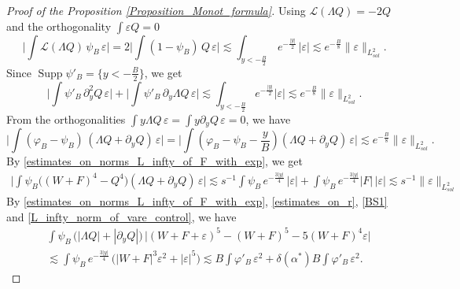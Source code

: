 \documentclass[16pt,english, oneside,reqno]{smfart}
\newcommand{\vare}{{\varepsilon}}
\newcommand{\vphi}{{\varphi}}
\DeclareMathOperator{\supp}{Supp}
\begin{document}
\begin{proof}[Proof of the Proposition \ref{Proposition_Monot_formula}]
Using $\mathcal{L}(\Lambda Q)  = -2 Q$ and the orthogonality $\int \vare Q = 0$
\begin{equation}
    \Big\lvert \int \mathcal{L}(\Lambda Q)\, \psi_B \, \vare  \Big\rvert = 2 \Big\lvert \int (1-\psi_B)\, Q \, \vare \Big\rvert \lesssim \int_{y < -\frac{B}{2}}\, e^{- \frac{|y|}{2}}\, |\vare| \lesssim e^{-\frac{B}{8}}\|\vare\|_{L^2_{sol}}.
\end{equation}
Since $\supp \psi'_B  = \{ y < -\frac{B}{2} \} $, we get
\begin{equation}
    \Big\lvert \int \psi'_B \, \partial^2_y Q \, \vare \Big\rvert + \Big\lvert \int \psi'_B \, \partial_y \Lambda Q \, \vare \Big\rvert \lesssim \int_{y < -\frac{B}{2}} e^{-\frac{|y|}{2}} |\vare| \lesssim e^{-\frac{B}{8}} \|\vare \|_{L^2_{sol}}.
\end{equation}
From the orthogonalities $\int y \Lambda Q \, \vare  = \int y \partial_y Q \, \vare = 0$, we have
\begin{equation}
        \Big\lvert \int (\vphi_B - \psi_B)\, (\Lambda Q+ \partial_y Q)\, \vare \Big\rvert  = \Big\lvert \int (\vphi_B - \psi_B - \frac{y}{B}) (\Lambda Q + \partial_y Q)\, \vare \Big\rvert  \lesssim e^{-\frac{B}{8}}\|\vare \|_{L^2_{sol}}.
\end{equation}
By \eqref{estimates_on_norms_L_infty_of_F_with_exp}, we get
\begin{equation}
\begin{split}
    \Big\lvert \int \psi_B \big( (W+F)^4 - Q^4 \big)(\Lambda Q + \partial_y Q)\, \vare \Big\rvert \lesssim  s^{-1}\int \psi_B\,  e^{-\frac{3|y|}{4}}\,|\vare| + \int \psi_B \, e^{-\frac{3|y|}{4}} |F|\, |\vare| \lesssim s^{-1}\|\vare \|_{L^2_{sol}}
\end{split}
\end{equation}
By \eqref{estimates_on_norms_L_infty_of_F_with_exp}, \eqref{estimates_on_r}, \eqref{BS1} and \eqref{L_infty_norm_of_vare_control}, we have
\begin{equation}
    \begin{split}
        & \int \psi_B \, \big( |\Lambda Q| + |\partial_y Q| \big)\, \big| (W+F+\vare)^5 - (W+F)^5 - 5 (W+F)^4 \vare \big|\\ 
        & \lesssim \int \psi_B \, e^{-\frac{3|y|}{4}}\, \big( |W+F|^3 \vare^2 + |\vare|^5 \big)
        \lesssim B\int \vphi'_B\,\vare^2 + \delta(\alpha^*)B\int \vphi'_B\,\vare^2.
    \end{split}
\end{equation}


\end{proof}
\end{document}
